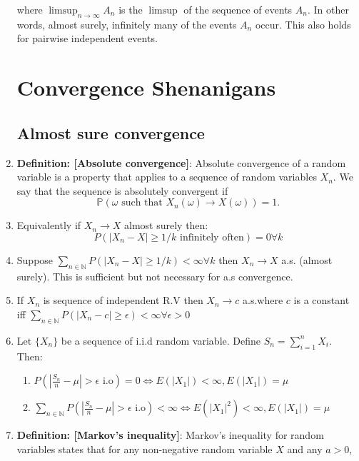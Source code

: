 \documentclass[12pt,oneside]{book}
\begin{document}
\begin{enumerate}
where $\limsup_{n\to\infty} A_n$ is the $\limsup$ of the sequence of events ${A_n}$. In other words, almost surely, infinitely many of the events $A_n$ occur. This also holds for pairwise independent events.


\chapter{Convergence Shenanigans}
\section{Almost sure convergence}
\item \textbf{Definition: [Absolute convergence]}: Absolute convergence of a random variable is a property that applies to a sequence of random variables ${X_n}$. We say that the sequence is absolutely convergent if 
\begin{equation*}
\mathbb{P} \left(\omega\text{ such that }X_n(\omega)\to X(\omega) \right) = 1.
\end{equation*}

\item Equivalently if $X_n\to X$ almost surely then:
$$P\left(|X_n-X|\geq 1/k\text{ infinitely often}\right)=0\forall k$$

\item Suppose $\sum_{n\in\mathbb N}P\left(|X_n-X|\geq 1/k\right)< \infty\forall k$ then $X_n\to X$ a.s. (almost surely). This is sufficient but not necessary for a.s convergence. 

\item If $X_n$ is sequence of independent R.V then $X_n\to c$ a.s.where $c$ is a constant iff $\sum_{n\in\mathbb N}P\left(|X_n-c|\geq \epsilon\right)< \infty\forall \epsilon>0$

\item Let $\{X_n\}$ be a sequence of i.i.d random variable. Define $S_n=\sum_{i=1}^n X_i$. Then:
\begin{enumerate}
    \item $P\left(\left|\frac{S_n}{n}-\mu\right|>\epsilon\text{ i.o}\right)=0\Leftrightarrow E(|X_1|)<\infty,E(|X_1|)=\mu$
    \item $\sum_{n\in\mathbb N} P\left(\left|\frac{S_n}{n}-\mu\right|>\epsilon\text{ i.o}\right)<\infty\Leftrightarrow E(|X_1|^2)<\infty,E(|X_1|)=\mu$
\end{enumerate}
\item \textbf{Definition: [Markov's inequality]}: Markov's inequality for random variables states that for any non-negative random variable $X$ and any $a > 0$,


\end{enumerate}
\end{document}

